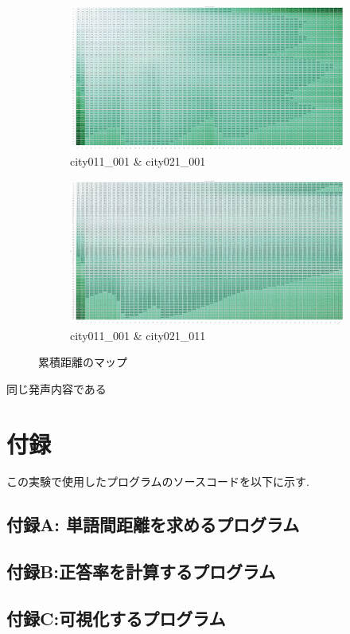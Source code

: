 \documentclass[a4paper,12pt]{article}
\begin{document}
\begin{figure}[h]
    \begin{subfigure}[b]{0.45\textwidth}
      \centering
      \includegraphics[width=\textwidth,bb=0.000000 0.000000 1329.122658 697.681395]{./diffpeople.png}
      \caption{}
      \caption{city011\_001 \& city021\_001}
      \label{fig:diffpeople}
    \end{subfigure}
    \hfill
    \begin{subfigure}[b]{0.45\textwidth}
      \centering
      \includegraphics[width=\textwidth,bb=0.000000 0.000000 1329.122658 697.681395]{./diffword.png}
      \caption{city011\_001 \& city021\_011}
      \label{fig:diffword}
    \end{subfigure}
  
    \caption{累積距離のマップ}
    \label{fig:grid}
\end{figure}

同じ発声内容である


\newpage

\appendix
\section{付録}
この実験で使用したプログラムのソースコードを以下に示す.

\subsection{付録A: 単語間距離を求めるプログラム}


\subsection{付録B:正答率を計算するプログラム}


\subsection{付録C:可視化するプログラム}

\end{document}
